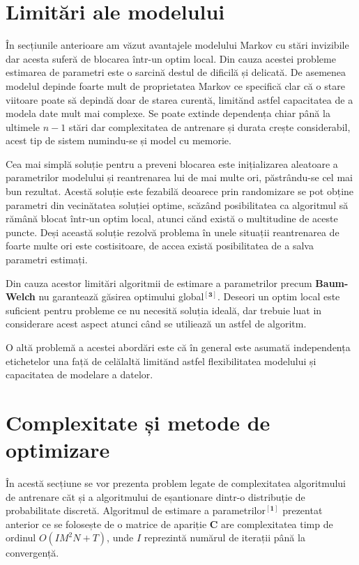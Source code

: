 \section{Limitări ale modelului}

În secțiunile anterioare am văzut avantajele modelului Markov cu stări invizibile dar acesta suferă de blocarea într-un optim local. Din cauza acestei probleme estimarea de parametri este o sarcină destul de dificilă și delicată. De asemenea modelul depinde foarte mult de proprietatea Markov ce specifică clar că o stare viitoare poate să depindă doar de starea curentă, limitănd astfel capacitatea de a modela date mult mai complexe. Se poate extinde dependența chiar până la ultimele $n-1$ stări dar complexitatea de antrenare și durata crește considerabil, acest tip de sistem numindu-se și model cu memorie.
\par

Cea mai simplă soluție pentru a preveni blocarea este inițializarea aleatoare a parametrilor modelului și reantrenarea lui de mai multe ori, păstrându-se cel mai bun rezultat. Acestă soluție este fezabilă deoarece prin randomizare se pot obține parametri din vecinătatea soluției optime, scăzând posibilitatea ca algoritmul să rămână blocat într-un optim local, atunci cănd există o multitudine de aceste puncte. Deși această soluție rezolvă problema în unele situații reantrenarea de foarte multe ori este costisitoare, de accea există posibilitatea de a salva parametri estimați.\par

Din cauza acestor limitări algoritmii de estimare a parametrilor precum \textbf{Baum-Welch} nu garantează găsirea optimului global$^{\mathbf{[3]}}$. Deseori un optim local este suficient pentru probleme ce nu necesită soluția ideală, dar trebuie luat in considerare acest aspect atunci când se utiliează un astfel de algoritm.\par

O altă problemă a acestei abordări este că în general este asumată independența etichetelor una față de celălaltă limitănd astfel flexibilitatea modelului și capacitatea de modelare a datelor.\par

\section{Complexitate și metode de optimizare}

În acestă secțiune se vor prezenta problem legate de complexitatea algoritmului de antrenare căt și a algoritmului de eșantionare dintr-o distribuție de probabilitate discretă. Algoritmul de estimare a parametrilor$^{\mathbf{[1]}}$ prezentat anterior ce se folosește de o matrice de apariție \textbf{C} are complexitatea timp de ordinul $O(IM^{2}N+T)$, unde $I$ reprezintă numărul de iterații până la convergență.\par

